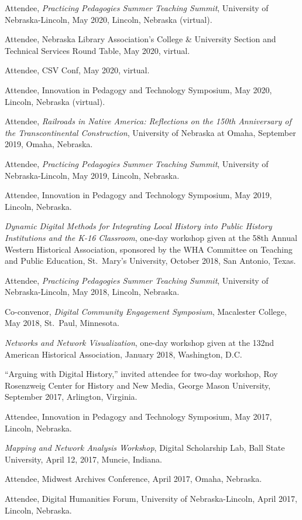 Attendee, \emph{Practicing Pedagogies Summer Teaching Summit},
University of Nebraska-Lincoln, May 2020, Lincoln, Nebraska (virtual).

Attendee, Nebraska Library Association's College \& University Section
and Technical Services Round Table, May 2020, virtual.

Attendee, CSV Conf, May 2020, virtual.

Attendee, Innovation in Pedagogy and Technology Symposium, May 2020,
Lincoln, Nebraska (virtual).

Attendee, \emph{Railroads in Native America: Reflections on the 150th
Anniversary of the Transcontinental Construction}, University of
Nebraska at Omaha, September 2019, Omaha, Nebraska.

Attendee, \emph{Practicing Pedagogies Summer Teaching Summit},
University of Nebraska-Lincoln, May 2019, Lincoln, Nebraska.

Attendee, Innovation in Pedagogy and Technology Symposium, May 2019,
Lincoln, Nebraska.

\emph{Dynamic Digital Methods for Integrating Local History into Public
History Institutions and the K-16 Classroom}, one-day workshop given at
the 58th Annual Western Historical Association, sponsored by the WHA
Committee on Teaching and Public Education, St.~Mary's University,
October 2018, San Antonio, Texas.

Attendee, \emph{Practicing Pedagogies Summer Teaching Summit},
University of Nebraska-Lincoln, May 2018, Lincoln, Nebraska.

Co-convenor, \emph{Digital Community Engagement Symposium}, Macalester
College, May 2018, St.~Paul, Minnesota.

\emph{Networks and Network Visualization}, one-day workshop given at the
132nd American Historical Association, January 2018, Washington, D.C.

``Arguing with Digital History,'' invited attendee for two-day workshop,
Roy Rosenzweig Center for History and New Media, George Mason
University, September 2017, Arlington, Virginia.

Attendee, Innovation in Pedagogy and Technology Symposium, May 2017,
Lincoln, Nebraska.

\emph{Mapping and Network Analysis Workshop}, Digital Scholarship Lab,
Ball State University, April 12, 2017, Muncie, Indiana.

Attendee, Midwest Archives Conference, April 2017, Omaha, Nebraska.

Attendee, Digital Humanities Forum, University of Nebraska-Lincoln,
April 2017, Lincoln, Nebraska.

